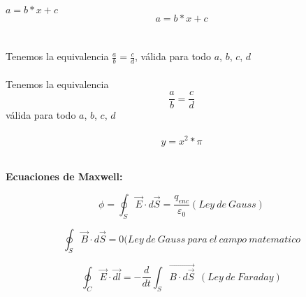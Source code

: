 \documentclass[10pt,a4paper]{article}
\author{Maria del Carmen}
\begin{document}
$ a =  b  *  x  +  c $ %
$$ a =  b  *  x  +  c $$ %
\\ \\
Tenemos la equivalencia $\frac{a}{b}= \frac{c}{d}$, válida para todo $a$, $b$, $c$, $d$ \\ \\
Tenemos la equivalencia $$\frac{a}{b}=\frac{c}{d}$$ válida para todo  $a$, $b$, $c$, $d$ \\ \\


\begin{displaymath}
  y=x^{2} * \pi 
\end{displaymath}\\ 

\begin{center}
\textbf{Ecuaciones de Maxwell:} \\
\end{center} 

\begin{equation}
\phi = \oint_{S} \overrightarrow{E}\cdot d\overrightarrow{S}= \frac{q_{enc}}{\varepsilon_{0}}   (Ley\ de\ Gauss)
\end{equation} 

\begin{equation}
\oint_{S} \overrightarrow{B}\cdot d\overrightarrow{S} = 0(Ley\ de\ Gauss\ para\ el\ campo\ matematico
\end{equation}

\begin{equation} 
\oint_{C} \overrightarrow{E} \cdot \overrightarrow{dl} = - \frac{d}{dt} \int_{S} \overrightarrow{B \cdot d\overrightarrow{S}} \ \ (Ley\ de\ Faraday)
\end{equation}
\end{document}
